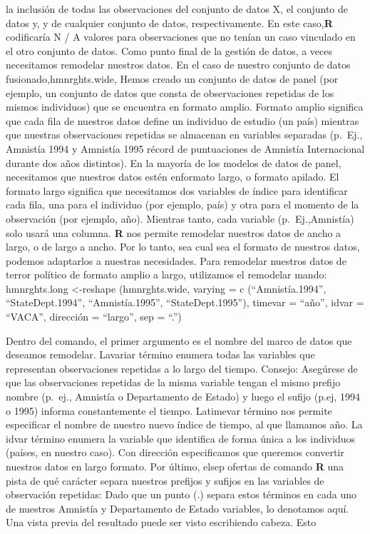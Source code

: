\documentclass[
]{book}
\begin{document}
la inclusión de todas las observaciones del conjunto de datos X, el conjunto de datos y, y de cualquier conjunto de datos, respectivamente. En este caso,\textbf{R} codificaría N / A valores para observaciones que no tenían un caso vinculado en el otro conjunto de datos.
Como punto final de la gestión de datos, a veces necesitamos remodelar nuestros datos. En el caso de nuestro conjunto de datos fusionado,hmnrghts.wide, Hemos creado un conjunto de datos de panel (por ejemplo, un conjunto de datos que consta de observaciones repetidas de los mismos individuos) que se encuentra en
formato amplio. Formato amplio significa que cada fila de nuestros datos define un individuo de estudio (un
país) mientras que nuestras observaciones repetidas se almacenan en variables separadas (p.~Ej.,
Amnistía 1994 y Amnistía 1995 récord de puntuaciones de Amnistía Internacional durante dos años distintos). En la mayoría de los modelos de datos de panel, necesitamos que nuestros datos estén enformato largo,
o formato apilado. El formato largo significa que necesitamos dos variables de índice para identificar cada
fila, una para el individuo (por ejemplo, país) y otra para el momento de la observación (por ejemplo, año). Mientras tanto, cada variable (p.~Ej.,Amnistía) solo usará una columna. \textbf{R} nos permite remodelar nuestros datos de ancho a largo, o de largo a ancho. Por lo tanto, sea cual sea el formato de nuestros datos, podemos adaptarlos a nuestras necesidades.
Para remodelar nuestros datos de terror político de formato amplio a largo, utilizamos el remodelar
mando:
hmnrghts.long \textless-reshape (hmnrghts.wide, varying = c (``Amnistía.1994'', ``StateDept.1994'', ``Amnistía.1995'', ``StateDept.1995''), timevar = ``año'', idvar = ``VACA'', dirección = ``largo'', sep = ``.'')

Dentro del comando, el primer argumento es el nombre del marco de datos que deseamos remodelar. Lavariar término enumera todas las variables que representan observaciones repetidas a lo largo del tiempo. Consejo: Asegúrese de que las observaciones repetidas de la misma variable tengan el mismo prefijo nombre (p.~ej., Amnistía o Departamento de Estado) y luego el sufijo
(p.ej, 1994 o 1995) informa constantemente el tiempo. Latimevar término nos permite especificar el nombre de nuestro nuevo índice de tiempo, al que llamamos año. La idvar término enumera la variable que identifica de forma única a los individuos (países, en nuestro caso). Con
dirección especificamos que queremos convertir nuestros datos en largo formato. Por último, elsep ofertas de comando \textbf{R} una pista de qué carácter separa nuestros prefijos y sufijos en las variables de observación repetidas: Dado que un punto (.) separa estos términos en cada uno de nuestros Amnistía y Departamento de Estado variables, lo denotamos aquí.
Una vista previa del resultado puede ser visto escribiendo cabeza. Esto
\end{document}
